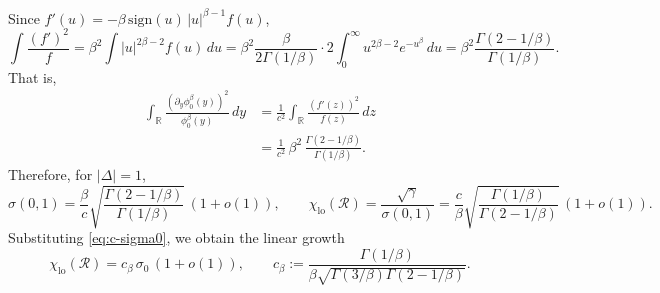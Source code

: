 \documentclass{article}
\theoremstyle{plain}
\theoremstyle{definition}
\begin{document}
Since $f'(u)=-\beta\,\mathrm{sign}(u)\,|u|^{\beta-1}f(u)$,
\[
\int \frac{(f')^2}{f}
=
\beta^2\int |u|^{2\beta-2}f(u)\,du
=
\beta^2\frac{\beta}{2\Gamma(1/\beta)}\cdot 2\int_0^\infty u^{2\beta-2}e^{-u^\beta}\,du
=
\beta^2\frac{\Gamma(2-1/\beta)}{\Gamma(1/\beta)}.
\]
That is,
\begin{align}
\int_{\mathbb R}\frac{(\partial_y \phi_0^\beta(y))^2}{\phi_0^\beta(y)}\,dy
&=
\frac{1}{c^2}\int_{\mathbb R}\frac{(f'(z))^2}{f(z)}\,dz
\label{eq:fisher}\\
&=
\frac{1}{c^2}\,\beta^2\,\frac{\Gamma(2-1/\beta)}{\Gamma(1/\beta)}.
\nonumber
\end{align}
Therefore, for $|\Delta|=1$,
\[
\sigma(0,1)
=
\frac{\beta}{c}\sqrt{\frac{\Gamma(2-1/\beta)}{\Gamma(1/\beta)}}\,(1+o(1)),
\qquad
\chi_{\mathrm{lo}}(\mathcal R)
=
\frac{\sqrt\gamma}{\sigma(0,1)}
=
\frac{c}{\beta}\sqrt{\frac{\Gamma(1/\beta)}{\Gamma(2-1/\beta)}}\,(1+o(1)).
\]
Substituting \eqref{eq:c-sigma0}, we obtain the linear growth
\begin{equation}
\label{eq:chi-large-noise}
\chi_{\mathrm{lo}}(\mathcal R)
=
c_\beta\,\sigma_0\,(1+o(1)),
\qquad
c_\beta
:=
\frac{\Gamma(1/\beta)}{\beta\sqrt{\Gamma(3/\beta)\Gamma(2-1/\beta)}}.
\end{equation}
\end{document}
